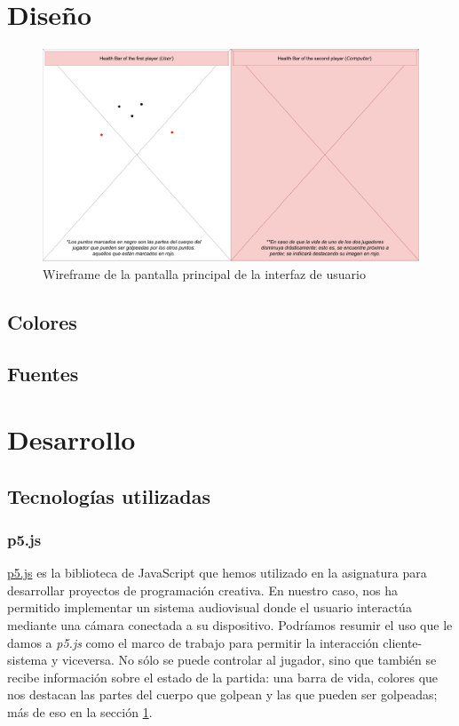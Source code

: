 \documentclass{article}
\begin{document}
\section{Diseño}
\label{section:design}

\begin{figure}[h]
    \centering
    \includegraphics[width=\textwidth]{img/wireframe1}
    \caption{Wireframe de la pantalla principal de la interfaz de usuario}
    \label{fig:mesh1}
\end{figure}

\subsection{Colores}

\subsection{Fuentes}

\section{Desarrollo}
\label{section:development}

\subsection{Tecnologías utilizadas}

\subsubsection{p5.js}

\href{https://p5js.org/es/}{p5.js} es la biblioteca de JavaScript que hemos utilizado en la asignatura para desarrollar proyectos de programación creativa. En nuestro caso, nos ha permitido implementar un sistema audiovisual donde el usuario interactúa mediante una cámara conectada a su dispositivo. Podríamos resumir el uso que le damos a \textit{p5.js} como el marco de trabajo para permitir la interacción cliente-sistema y viceversa. No sólo se puede controlar al jugador, sino que también se recibe información sobre el estado de la partida: una barra de vida, colores que nos destacan las partes del cuerpo que golpean y las que pueden ser golpeadas; más de eso en la sección \ref{section:design}.
\end{document}

